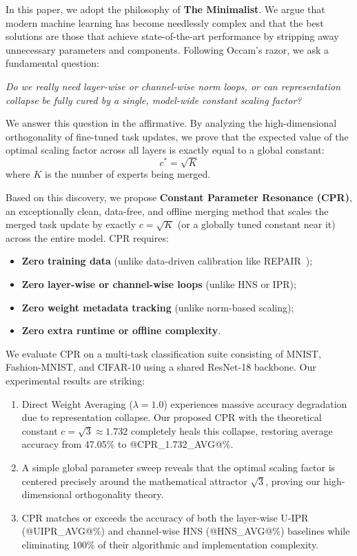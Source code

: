 \documentclass{article}
\theoremstyle{plain}
\theoremstyle{definition}
\theoremstyle{remark}
\begin{document}
In this paper, we adopt the philosophy of \textbf{The Minimalist}. We argue that modern machine learning has become needlessly complex and that the best solutions are those that achieve state-of-the-art performance by stripping away unnecessary parameters and components. Following Occam's razor, we ask a fundamental question:
\begin{center}
\emph{Do we really need layer-wise or channel-wise norm loops, or can representation collapse be fully cured by a single, model-wide constant scaling factor?}
\end{center}

We answer this question in the affirmative. By analyzing the high-dimensional orthogonality of fine-tuned task updates, we prove that the expected value of the optimal scaling factor across all layers is exactly equal to a global constant:
\begin{equation}
c^* = \sqrt{K}
\end{equation}
where $K$ is the number of experts being merged. 

Based on this discovery, we propose \textbf{Constant Parameter Resonance (CPR)}, an exceptionally clean, data-free, and offline merging method that scales the merged task update by exactly $c = \sqrt{K}$ (or a globally tuned constant near it) across the entire model. CPR requires:
\begin{itemize}
\item \textbf{Zero training data} (unlike data-driven calibration like REPAIR~\cite{jordan2023repair});
\item \textbf{Zero layer-wise or channel-wise loops} (unlike HNS or IPR);
\item \textbf{Zero weight metadata tracking} (unlike norm-based scaling);
\item \textbf{Zero extra runtime or offline complexity}.
\end{itemize}

We evaluate CPR on a multi-task classification suite consisting of MNIST, Fashion-MNIST, and CIFAR-10 using a shared ResNet-18 backbone. Our experimental results are striking:
\begin{enumerate}
\item Direct Weight Averaging ($\lambda=1.0$) experiences massive accuracy degradation due to representation collapse.
Our proposed CPR with the theoretical constant $c = \sqrt{3} \approx 1.732$ completely heals this collapse, restoring average accuracy from 47.05\% to @CPR_1.732_AVG@\%.
\item A simple global parameter sweep reveals that the optimal scaling factor is centered precisely around the mathematical attractor $\sqrt{3}$, proving our high-dimensional orthogonality theory.
\item CPR matches or exceeds the accuracy of both the layer-wise U-IPR (@UIPR_AVG@\%) and channel-wise HNS (@HNS_AVG@\%) baselines while eliminating 100\% of their algorithmic and implementation complexity.
\end{enumerate}
\end{document}
